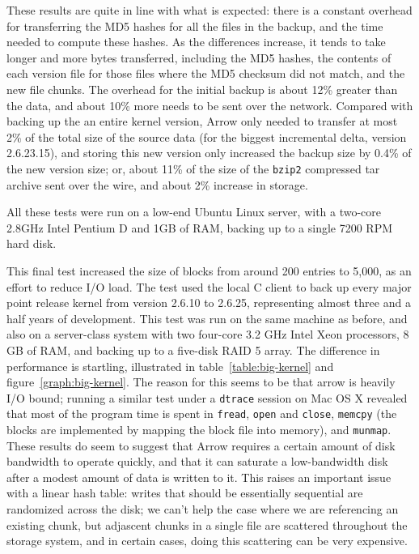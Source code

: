 \documentclass{article}
\begin{document}
These results are quite in line with what is expected: there is a
constant overhead for transferring the MD5 hashes for all the files in
the backup, and the time needed to compute these hashes. As the
differences increase, it tends to take longer and more bytes
transferred, including the MD5 hashes, the contents of each version
file for those files where the MD5 checksum did not match, and the new
file chunks. The overhead for the initial backup is about 12\% greater
than the data, and about 10\% more needs to be sent over the
network. Compared with backing up the an entire kernel version, Arrow
only needed to transfer at most 2\% of the total size of the source
data (for the biggest incremental delta, version 2.6.23.15), and
storing this new version only increased the backup size by 0.4\% of
the new version size; or, about 11\% of the size of the \texttt{bzip2}
compressed tar archive sent over the wire, and about 2\% increase in
storage.

All these tests were run on a low-end Ubuntu Linux server, with a
two-core 2.8GHz Intel Pentium D and 1GB of RAM, backing up to a single
7200 RPM hard disk.

This final test increased the size of blocks from around 200 entries
to 5,000, as an effort to reduce I/O load. The test used the local C
client to back up every major point release kernel from version 2.6.10
to 2.6.25, representing almost three and a half years of
development. This test was run on the same machine as before, and also
on a server-class system with two four-core 3.2 GHz Intel Xeon
processors, 8 GB of RAM, and backing up to a five-disk RAID 5
array. The difference in performance is startling, illustrated in
table~\ref{table:big-kernel} and figure~\ref{graph:big-kernel}. The
reason for this seems to be that arrow is heavily I/O bound; running a
similar test under a \texttt{dtrace} session on Mac OS X revealed that
most of the program time is spent in \texttt{fread}, \texttt{open} and
\texttt{close}, \texttt{memcpy} (the blocks are implemented by mapping
the block file into memory), and \texttt{munmap}. These results do
seem to suggest that Arrow requires a certain amount of disk bandwidth
to operate quickly, and that it can saturate a low-bandwidth disk
after a modest amount of data is written to it. This raises an
important issue with a linear hash table: writes that should be
essentially sequential are randomized across the disk; we can't help
the case where we are referencing an existing chunk, but adjascent
chunks in a single file are scattered throughout the storage system,
and in certain cases, doing this scattering can be very expensive.
\end{document}
